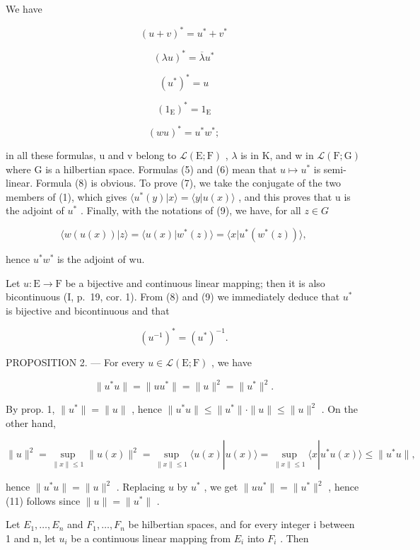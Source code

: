 We have

\[
(u + v) ^ {*} = u ^ {*} + v ^ {*}\tag{5}
\]

\[
(\lambda u) ^ {*} = \overline {{{{\lambda}}}} u ^ {*}\tag{6}
\]

\[
(u ^ {*}) ^ {*} = u\tag{7}
\]

\[
(1 _ {\mathrm{E}}) ^ {*} = 1 _ {\mathrm{E}}\tag{8}
\]

\[
(w u) ^ {*} = u ^ {*} w ^ {*};\tag{9}
\]

in all these formulas, u and v belong to \(\mathcal{L}(\mathrm{E};\mathrm{F})\) , \(\lambda\) is in K, and w in \(\mathcal{L}(\mathrm{F};\mathrm{G})\) where G is a hilbertian space. Formulas (5) and (6) mean that \(u\mapsto u^{*}\) is semi-linear. Formula (8) is obvious. To prove (7), we take the conjugate of the two members of (1), which gives \(\langle u^{*}(y)|x\rangle = \langle y|u(x)\rangle\) , and this proves that u is the adjoint of \(u^{*}\) . Finally, with the notations of (9), we have, for all \(z \in G\)

\[
\langle w (u (x)) | z \rangle = \langle u (x) | w ^ {*} (z) \rangle = \langle x | u ^ {*} (w ^ {*} (z)) \rangle ,
\]

hence \(u^{*}w^{*}\) is the adjoint of wu.

Let \(u: \mathrm{E} \to \mathrm{F}\) be a bijective and continuous linear mapping; then it is also bicontinuous (I, p.~19, cor. 1). From (8) and (9) we immediately deduce that \(u^*\) is bijective and bicontinuous and that

\[
(u ^ {- 1}) ^ {*} = (u ^ {*}) ^ {- 1}.\tag{10}
\]

PROPOSITION 2. --- For every \(u \in \mathcal{L}(\mathrm{E};\mathrm{F})\) , we have

\[
\| u ^ {*} u \| = \| u u ^ {*} \| = \| u \| ^ {2} = \| u ^ {*} \| ^ {2}.\tag{11}
\]

By prop. 1, \(\| u^{*}\| = \| u\|\) , hence \(\| u^{*}u\| \leqslant \| u^{*}\| \cdot \| u\| \leqslant \| u\|^2\) . On the other hand,

\[
\| u \| ^ {2} = \sup _ {\| x \| \leqslant 1} \| u (x) \| ^ {2} = \sup _ {\| x \| \leqslant 1} \langle u (x) | u (x) \rangle = \sup _ {\| x \| \leqslant 1} \langle x | u ^ {*} u (x) \rangle \leqslant \| u ^ {*} u \|,
\]

hence \(\| u^{*}u\| = \| u\|^2\) . Replacing \(u\) by \(u^{*}\) , we get \(\| uu^{*}\| = \| u^{*}\|^2\) , hence (11) follows since \(\| u\| = \| u^{*}\|\) .

Let \(E_{1}, \ldots, E_{n}\) and \(F_{1}, \ldots, F_{n}\) be hilbertian spaces, and for every integer i between 1 and n, let \(u_{i}\) be a continuous linear mapping from \(E_{i}\) into \(F_{i}\) . Then

